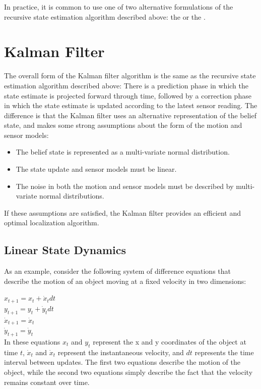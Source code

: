 In practice, it is common to use one of two alternative formulations
of the recursive state estimation algorithm described above: the
 or the .

\section{Kalman Filter}

The overall form of the Kalman filter algorithm is the same as the
recursive state estimation algorithm described above: There is a
prediction phase in which the state estimate is projected forward
through time, followed by a correction phase in which the state
estimate is updated according to the latest sensor reading. The
difference is that the Kalman filter uses an alternative
representation of the belief state, and makes some strong assumptions
about the form of the motion and sensor models:

\begin{itemize}
\item The belief state is represented as a multi-variate normal
  distribution.
\item The state update and sensor models must be linear.
\item The noise in both the motion and sensor models must be described
  by multi-variate normal distributions.
\end{itemize}

If these assumptions are satisfied, the Kalman filter provides an
efficient and optimal localization algorithm.

\subsection{Linear State Dynamics}

As an example, consider the following system of difference equations
that describe the motion of an object moving at a fixed velocity in
two dimensions:

$x_{t+1} = x_{t} + \dot{x}_t dt$ \\
$y_{t+1} = y_{t} + \dot{y}_t dt$ \\
$\dot{x}_{t+1} =  \dot{x}_t$ \\
$\dot{y}_{t+1} =  \dot{y}_t$ \\

In these equations $x_t$ and $y_t$ represent the x and y coordinates
of the object at time $t$, $\dot{x}_t$ and $\dot{x}_t$ represent the
instantaneous velocity, and $dt$ represents the time interval between
updates. The first two equations describe the motion of the object,
while the second two equations simply describe the fact that the
velocity remains constant over time.

